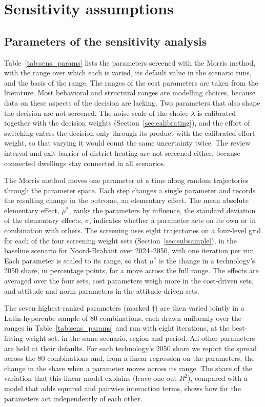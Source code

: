 \documentclass[preprint,12pt,authoryear]{elsarticle}
\begin{document}
\section{Sensitivity assumptions}

\subsection{Parameters of the sensitivity analysis}
\label{app:sensitivity}
Table~\ref{tab:sens_params} lists the parameters screened with the Morris
method, with the range over which each is varied, its default value in the
scenario runs, and the basis of the range. The ranges of the cost parameters
are taken from the literature. Most behavioral and structural ranges are
modelling choices, because data on these aspects of the decision are lacking.
Two parameters that also shape the decision are not screened. The noise scale
of the choice $\lambda$ is calibrated together with the decision weights
(Section~\ref{sec:calibrating}), and the effort of switching enters the
decision only through its product with the calibrated effort weight, so that
varying it would count the same uncertainty twice. The review interval and
exit barrier of district heating are not screened either, because connected
dwellings stay connected in all scenarios.

The Morris method \citep{morris_factorial_1991,
campolongoEffectiveScreeningDesign2007} moves one parameter at a time along
random trajectories through the parameter space. Each step changes a single
parameter and records the resulting change in the outcome, an elementary
effect. The mean absolute elementary effect, $\mu^*$, ranks the parameters by
influence, the standard deviation of the elementary effects, $\sigma$,
indicates whether a parameter acts on its own or in combination with others.
The screening uses eight trajectories on a four-level grid for each of the
four screening weight sets (Section~\ref{sec:subsample}), in the baseline
scenario for Noord-Brabant over 2024--2050, with one iteration per run. Each
parameter is scaled to its range, so that $\mu^*$ is the change in a
technology's 2050 share, in percentage points, for a move across the full
range. The effects are averaged over the four sets, cost parameters weigh
more in the cost-driven sets, and attitude and norm parameters in the
attitude-driven sets.

The seven highest-ranked parameters (marked $\dagger$) are then varied
jointly in a Latin-hypercube sample of 80 combinations, each drawn uniformly
over the ranges in Table~\ref{tab:sens_params} and run with eight iterations,
at the best-fitting weight set, in the same scenario, region and period. All
other parameters are held at their defaults. 
For each technology's 2050 share we report the spread across the 80
combinations and, from a linear regression on the parameters, the change in
the share when a parameter moves across its range. The share of the
variation that this linear model explains (leave-one-out $R^2$), compared
with a model that adds squared and pairwise interaction terms, shows how far
the parameters act independently of each other.
\end{document}
